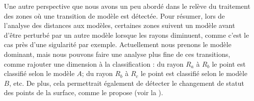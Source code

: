 Une autre perspective que nous avons un peu abordé dans le
 relève du traitement des
zones où une transition de modèle est détectée. Pour résumer, lors de l'analyse des distances aux modèles, certaines zones suivent un modèle avant d'être perturbé par un autre modèle lorsque les rayons diminuent, comme c'est le cas près d'une sigularité par exemple. Actuellement nous prenons
le modèle dominant, mais nous pouvons faire une analyse plus fine de ces
transitions, comme rajouter une dimension à la classification : du rayon $R_a$ à
$R_b$ le point est classifié selon le modèle $A$; du rayon $R_b$ à $R_c$ le
point est classifié selon le modèle $B$, etc. De plus, cela permettrait
également de détecter le changement de statut des points de la surface, comme le
propose  (voir la
).

%

%
%
%
%
%
